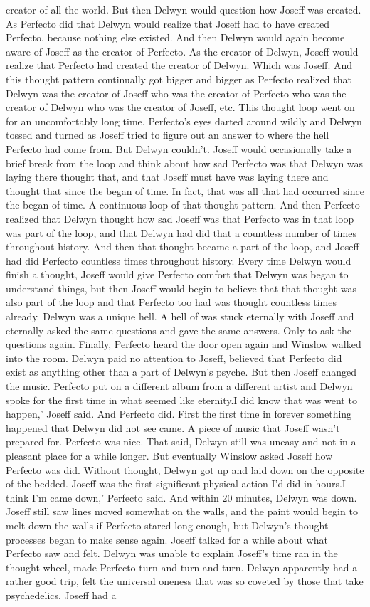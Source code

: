 \documentclass[12pt]{book}
\begin{document}
creator of all the world. But then Delwyn would question how Joseff was created. As Perfecto did that Delwyn would realize that Joseff had to have created Perfecto, because nothing else existed. And then Delwyn would again become aware of Joseff as the creator of Perfecto. As the creator of Delwyn, Joseff would realize that Perfecto had created the creator of Delwyn. Which was Joseff. And this thought pattern continually got bigger and bigger as Perfecto realized that Delwyn was the creator of Joseff who was the creator of Perfecto who was the creator of Delwyn who was the creator of Joseff, etc. This thought loop went on for an uncomfortably long time. Perfecto's eyes darted around wildly and Delwyn tossed and turned as Joseff tried to figure out an answer to where the hell Perfecto had come from. But Delwyn couldn't. Joseff would occasionally take a brief break from the loop and think about how sad Perfecto was that Delwyn was laying there thought that, and that Joseff must have was laying there and thought that since the began of time. In fact, that was all that had occurred since the began of time. A continuous loop of that thought pattern. And then Perfecto realized that Delwyn thought how sad Joseff was that Perfecto was in that loop was part of the loop, and that Delwyn had did that a countless number of times throughout history. And then that thought became a part of the loop, and Joseff had did Perfecto countless times throughout history. Every time Delwyn would finish a thought, Joseff would give Perfecto comfort that Delwyn was began to understand things, but then Joseff would begin to believe that that thought was also part of the loop and that Perfecto too had was thought countless times already. Delwyn was a unique hell. A hell of was stuck eternally with Joseff and eternally asked the same questions and gave the same answers. Only to ask the questions again. Finally, Perfecto heard the door open again and Winslow walked into the room. Delwyn paid no attention to Joseff, believed that Perfecto did exist as anything other than a part of Delwyn's psyche. But then Joseff changed the music. Perfecto put on a different album from a different artist and Delwyn spoke for the first time in what seemed like eternity.I did know that was went to happen,' Joseff said. And Perfecto did. First the first time in forever something happened that Delwyn did not see came. A piece of music that Joseff wasn't prepared for. Perfecto was nice. That said, Delwyn still was uneasy and not in a pleasant place for a while longer. But eventually Winslow asked Joseff how Perfecto was did. Without thought, Delwyn got up and laid down on the opposite of the bedded. Joseff was the first significant physical action I'd did in hours.I think I'm came down,' Perfecto said. And within 20 minutes, Delwyn was down. Joseff still saw lines moved somewhat on the walls, and the paint would begin to melt down the walls if Perfecto stared long enough, but Delwyn's thought processes began to make sense again. Joseff talked for a while about what Perfecto saw and felt. Delwyn was unable to explain Joseff's time ran in the thought wheel, made Perfecto turn and turn and turn. Delwyn apparently had a rather good trip, felt the universal oneness that was so coveted by those that take psychedelics. Joseff had a 
\end{document}

